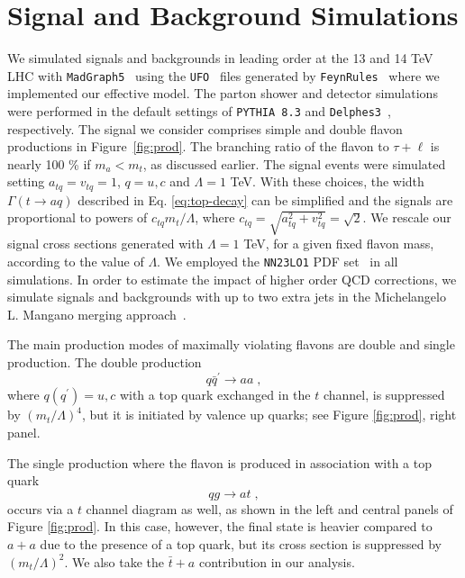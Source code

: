 \documentclass[prd,amsfonts,onecolumn,superscriptaddress,aps,nofootinbib,11pt]{revtex4-1}
\begin{document}
\section{Signal and Background Simulations}\label{backs}


We simulated signals and backgrounds in leading order at the 13 and 14 TeV LHC with \texttt{MadGraph5}~\cite{Alwall:2014hca, Frederix:2018nkq} using the \texttt{UFO}~\cite{Degrande:2011ua} files generated by \texttt{FeynRules}~\cite{Alloul:2013bka} where we implemented our effective model.  The parton shower and detector simulations were performed in the default settings of \texttt{PYTHIA 8.3} \cite{Bierlich:2022pfr} and \texttt{Delphes3}~\cite{deFavereau:2013fsa}, respectively. The signal we consider comprises simple and double flavon productions in Figure~\ref{fig:prod}. The branching ratio of the flavon to $\tau+\ell$ is nearly 100 \% if $m_a<m_t$, as discussed earlier. The signal events were simulated setting $a_{tq}=v_{tq}=1$, $q=u,c$ and $\Lambda=1$ TeV. With these choices, the width $\Gamma(t \to aq)$ described in Eq. \eqref{eq:top-decay} can be simplified and the signals are proportional to powers of $c_{tq} m_t/\Lambda$, where $c_{tq} = \sqrt{a_{tq}^2 + v_{tq}^2} = \sqrt{2}$. We rescale our signal cross sections generated with $\Lambda=1$ TeV, for a given fixed flavon mass, according to the value of $\Lambda$. We employed the \texttt{NN23LO1} PDF set~\cite{Ball_2017} in all simulations. In order to estimate the impact of higher order QCD corrections, we simulate signals and backgrounds with up to two extra jets in the Michelangelo L. Mangano merging approach~\cite{Mangano:2006rw}.

The main production modes of maximally violating flavons are double and single production.
The double production
\begin{equation}
    q\bar{q}^\prime \to aa\; ,
\end{equation}
where $q(q^\prime)=u,c$ with a top quark exchanged in the $t$ channel, is suppressed by $(m_t/\Lambda)^4$, but it is initiated by valence up quarks; see Figure \ref{fig:prod}, right panel. 

The single production where the flavon is produced in association with a top quark 
\begin{equation}
    qg\to at\; ,
\end{equation}
occurs via a $t$ channel diagram as well, as shown in the left and central panels of Figure \ref{fig:prod}. In this case, however, the final state is heavier compared to $a+a$ due to the presence of a top quark, but its cross section is suppressed by $(m_t/\Lambda)^2$. We also take the $\bar{t}+a$ contribution in our analysis.
\end{document}
